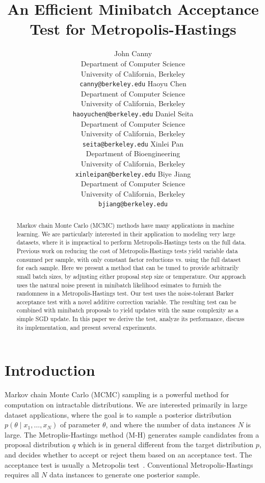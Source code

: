 \documentclass{article}
\title{An Efficient Minibatch Acceptance Test for Metropolis-Hastings}
\author{
  John Canny \\
  Department of Computer Science \\
  University of California, Berkeley \\
  \texttt{canny@berkeley.edu}
  \And
  Haoyu Chen \\
  Department of Computer Science \\
  University of California, Berkeley \\
  \texttt{haoyuchen@berkeley.edu}
  \And
  Daniel Seita \\
  Department of Computer Science \\
  University of California, Berkeley \\
  \texttt{seita@berkeley.edu}
  \And
  Xinlei Pan \\
  Department of Bioengineering \\
  University of California, Berkeley \\
  \texttt{xinleipan@berkeley.edu}
  \And 
  Biye Jiang \\
  Department of Computer Science \\
  University of California, Berkeley \\
  \texttt{bjiang@berkeley.edu}
 }
\begin{document}
\maketitle

\begin{abstract}
Markov chain Monte Carlo (MCMC) methods have many applications in
machine learning. We are particularly interested in their application
to modeling very large datasets, where it is impractical to perform
Metropolis-Hastings tests on the full data. Previous work on reducing
the cost of Metropolis-Hastings tests yield variable data consumed per
sample, with only constant factor reductions vs. using the full
dataset for each sample.  Here we present a method that can be tuned
to provide arbitrarily small batch sizes, by adjusting either proposal
step size or temperature. Our approach uses the natural noise present
in minibatch likelihood esimates to furnish the randomness in a
Metropolis-Hastings test. Our test uses the noise-tolerant Barker
acceptance test with a novel additive correction variable.  The
resulting test can be combined with minibatch proposals to yield
updates with the same complexity as a simple SGD update. In this paper
we derive the test, analyze its performance, discuss its
implementation, and present several experiments.
\end{abstract}



\section{Introduction}\label{sec:introduction}

Markov chain Monte Carlo (MCMC) sampling is a powerful method for
computation on intractable distributions. We are interested primarily
in large dataset applications, where the goal is to sample a posterior
distribution $p(\theta \mid x_1, \ldots, x_N)$ of parameter $\theta$,
and where the number of data instances $N$ is large.  The
Metroplis-Hastings method (M-H) generates sample candidates from a
proposal distribution $q$ which is in general different from the
target distribution $p$, and decides whether to accept or reject them
based on an acceptance test. The acceptance test is usually a
Metropolis test~\cite{Metropolis1953,hastings70}. Conventional
Metropolis-Hastings requires all $N$ data instances to generate one
posterior sample.
\end{document}

